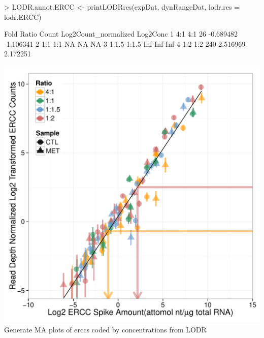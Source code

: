 \documentclass{article}
\begin{document}
\begin{Schunk}
\begin{Sinput}
> LODR.annot.ERCC <- printLODRres(expDat, dynRangeDat,
                                  lodr.res = lodr.ERCC)
\end{Sinput}
\begin{Soutput}
   Fold Ratio Count Log2Count_normalized  Log2Conc
1   4:1   4:1    26            -0.689482 -1.106341
2   1:1   1:1    NA                   NA        NA
3 1:1.5 1:1.5   Inf                  Inf       Inf
4   1:2   1:2   240             2.516969  2.172251
\end{Soutput}
\end{Schunk}
\includegraphics{erccdashboardVignetteTry2-017}
Generate MA plots of erccs coded by concentrations from LODR
\end{document}
